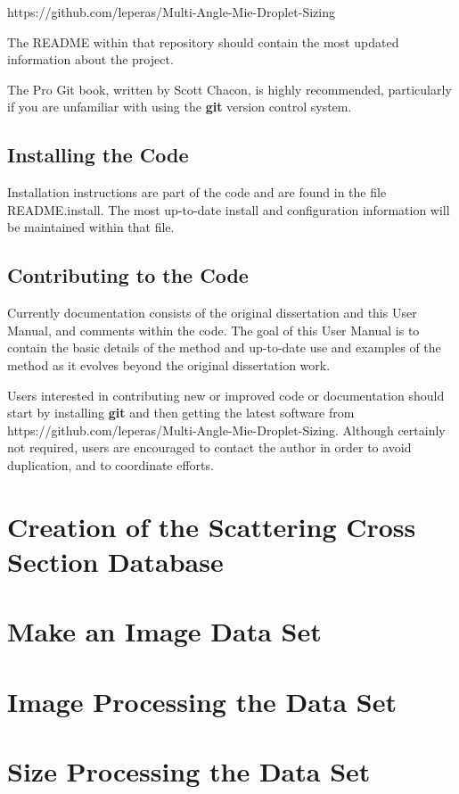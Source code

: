 https://github.com/leperas/Multi-Angle-Mie-Droplet-Sizing

The README within that repository should contain the most updated information about the project.

The Pro Git book, written by Scott Chacon, is highly recommended, particularly if you are unfamiliar with using the \textbf{git} version control system.

\subsection{Installing the Code}
Installation instructions are part of the code and are found in the file README.install.  The most up-to-date install and configuration information will be maintained within that file.

\subsection{Contributing to the Code}
Currently documentation consists of the original dissertation and this User Manual, and comments within the code. The goal of this User Manual is to contain the basic details of the method and up-to-date use and examples of the method as it evolves beyond the original dissertation work.

Users interested in contributing new or improved code or documentation should start by installing \textbf{git} and then getting the latest software from https://github.com/leperas/Multi-Angle-Mie-Droplet-Sizing.  Although certainly not required, users are encouraged to contact the author in order to avoid duplication, and to coordinate efforts.  

\section{Creation of the Scattering Cross Section Database}



\section{Make an Image Data Set}



\section{Image Processing the Data Set}

%

\section{Size Processing the Data Set}

%
